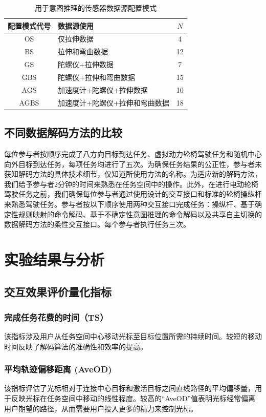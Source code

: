 \begin{table}
    \centering
    \caption{用于意图推理的传感器数据源配置模式}
    \setlength{\tabcolsep}{3pt}
    \begin{tabular}{c p{180pt} c }
    \hline\hline
    配置模式代号 & 数据源使用 & $N$ \\ 
    \hline
    OS& 仅拉伸数据& 4 \\ 
    BS& 拉伸和弯曲数据&12 \\ 
    GS& 陀螺仪+拉伸数据&7 \\ 
    GBS& 陀螺仪+拉伸和弯曲数据&15 \\ 
    AGS& 加速度计+陀螺仪+拉伸数据&10 \\ 
    AGBS& 加速度计+陀螺仪+拉伸和弯曲数据&18 \\ 
    \hline\hline
    \end{tabular}
    \label{tab3-1}
\end{table}     

\subsection{不同数据解码方法的比较} 每位参与者按顺序完成了八方向目标到达任务、虚拟动力轮椅驾驶任务和随机中心向外目标到达任务，每项任务均进行了五次。为确保任务结果的公正性，参与者未获知解码方法的具体技术细节，仅知道所使用方法的名称。为适应新的解码方法，我们给予参与者2分钟的时间来熟悉在任务空间中的操作。此外，在进行电动轮椅驾驶任务之前，我们确保每位参与者通过使用设计的交互接口和标准的轮椅操纵杆来熟悉驾驶任务。参与者按以下顺序使用两种交互接口完成任务：操纵杆、基于确定性规则映射的命令解码、基于不确定性意图推理的命令解码以及共享自主切换的数据解码方法的柔性交互接口。每个参与者执行任务三次。 

\section{实验结果与分析}     

\subsection{交互效果评价量化指标}   
 \subsubsection{完成任务花费的时间（TS）}该指标涉及用户从任务空间中心移动光标至目标位置所需的持续时间。较短的移动时间反映了解码算法的准确性和效率的提高。
 \subsubsection{平均轨迹偏移距离 (AveOD)}该指标评估了光标相对于连接中心目标和激活目标之间直线路径的平均偏移量，用于反映光标在任务空间中移动的线性程度。较高的``AveOD''值表明光标经常偏离用户期望的路径，从而需要用户投入更多的精力来控制光标。
